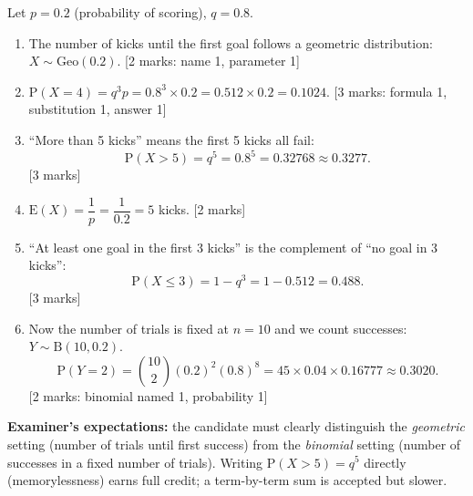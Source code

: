 \documentclass[11pt]{article}
\newcommand{\cle}[1]{{\popxbold\color{popdark}#1}}
\begin{document}
\begin{corrige}
Let $p = 0.2$ (probability of scoring), $q = 0.8$.
\begin{enumerate}
\item The number of kicks until the first goal follows a \cle{geometric distribution}: $X \sim \mathrm{Geo}(0.2)$. \hfill [2 marks: name 1, parameter 1]
\item $\mathrm{P}(X = 4) = q^{3}p = 0.8^{3} \times 0.2 = 0.512 \times 0.2 = 0.1024.$ \hfill [3 marks: formula 1, substitution 1, answer 1]
\item ``More than 5 kicks'' means the first 5 kicks all fail:
\[ \mathrm{P}(X > 5) = q^{5} = 0.8^{5} = 0.32768 \approx 0.3277. \] \hfill [3 marks]
\item $\mathrm{E}(X) = \dfrac{1}{p} = \dfrac{1}{0.2} = 5$ kicks. \hfill [2 marks]
\item ``At least one goal in the first 3 kicks'' is the complement of ``no goal in 3 kicks'':
\[ \mathrm{P}(X \le 3) = 1 - q^{3} = 1 - 0.512 = 0.488. \] \hfill [3 marks]
\item Now the number of trials is fixed at $n = 10$ and we count successes: $Y \sim \mathrm{B}(10, 0.2)$.
\[ \mathrm{P}(Y = 2) = \binom{10}{2}(0.2)^{2}(0.8)^{8} = 45 \times 0.04 \times 0.16777 \approx 0.3020. \] \hfill [2 marks: binomial named 1, probability 1]
\end{enumerate}
\textbf{Examiner's expectations:} the candidate must clearly distinguish the \emph{geometric} setting (number of trials until first success) from the \emph{binomial} setting (number of successes in a fixed number of trials). Writing $\mathrm{P}(X > 5) = q^5$ directly (memorylessness) earns full credit; a term-by-term sum is accepted but slower.
\end{corrige}
\end{document}
